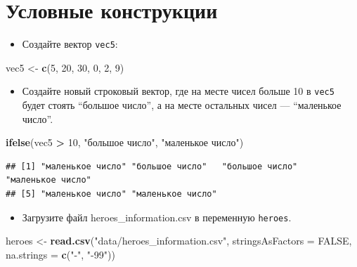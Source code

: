 \documentclass[]{book}
\newenvironment{Shaded}{\begin{snugshade}}{\end{snugshade}}
\newcommand{\KeywordTok}[1]{\textcolor[rgb]{0.13,0.29,0.53}{\textbf{#1}}}
\newcommand{\DataTypeTok}[1]{\textcolor[rgb]{0.13,0.29,0.53}{#1}}
\newcommand{\DecValTok}[1]{\textcolor[rgb]{0.00,0.00,0.81}{#1}}
\newcommand{\StringTok}[1]{\textcolor[rgb]{0.31,0.60,0.02}{#1}}
\newcommand{\OtherTok}[1]{\textcolor[rgb]{0.56,0.35,0.01}{#1}}
\newcommand{\OperatorTok}[1]{\textcolor[rgb]{0.81,0.36,0.00}{\textbf{#1}}}
\newcommand{\NormalTok}[1]{#1}
\providecommand{\tightlist}{%
  \setlength{\itemsep}{0pt}\setlength{\parskip}{0pt}}
\begin{document}
\section{Условные конструкции}\label{solution_if}

\begin{itemize}
\tightlist
\item
  Создайте вектор \texttt{vec5}:
\end{itemize}

\begin{Shaded}
\begin{Highlighting}[]
\NormalTok{vec5 <-}\StringTok{ }\KeywordTok{c}\NormalTok{(}\DecValTok{5}\NormalTok{, }\DecValTok{20}\NormalTok{, }\DecValTok{30}\NormalTok{, }\DecValTok{0}\NormalTok{, }\DecValTok{2}\NormalTok{, }\DecValTok{9}\NormalTok{)}
\end{Highlighting}
\end{Shaded}

\begin{itemize}
\tightlist
\item
  Создайте новый строковый вектор, где на месте чисел больше 10 в
  \texttt{vec5} будет стоять ``большое число'', а на месте остальных
  чисел --- ``маленькое число''.
\end{itemize}

\begin{Shaded}
\begin{Highlighting}[]
\KeywordTok{ifelse}\NormalTok{(vec5 }\OperatorTok{>}\StringTok{ }\DecValTok{10}\NormalTok{, }\StringTok{"большое число"}\NormalTok{, }\StringTok{"маленькое число"}\NormalTok{)}
\end{Highlighting}
\end{Shaded}

\begin{verbatim}
## [1] "маленькое число" "большое число"   "большое число"   "маленькое число"
## [5] "маленькое число" "маленькое число"
\end{verbatim}

\begin{itemize}
\tightlist
\item
  Загрузите файл heroes\_information.csv в переменную \texttt{heroes}.
\end{itemize}

\begin{Shaded}
\begin{Highlighting}[]
\NormalTok{heroes <-}\StringTok{ }\KeywordTok{read.csv}\NormalTok{(}\StringTok{"data/heroes_information.csv"}\NormalTok{, }
                   \DataTypeTok{stringsAsFactors =} \OtherTok{FALSE}\NormalTok{,}
                   \DataTypeTok{na.strings =} \KeywordTok{c}\NormalTok{(}\StringTok{"-"}\NormalTok{, }\StringTok{"-99"}\NormalTok{))}
\end{Highlighting}
\end{Shaded}
\end{document}

